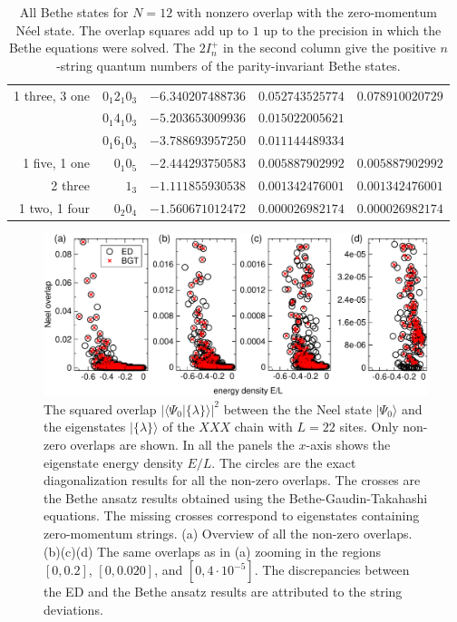 \documentclass[11pt]{iopart}
\begin{document}
\begin{table}[h]
\begin{tabular}{rrrrr}
    \midrule
1 three, 3 one &$0_1 2_1 0_3$ & $-6.340207488736$ & $0.052743525774$ & $0.078910020729$ \\
  &$0_1 4_1 0_3$ & $-5.203653009936$ & $0.015022005621$ \\
  &$0_1 6_1 0_3$ & $-3.788693957250$ & $0.011144489334$ \\
      \midrule
1 five, 1 one &$0_1 0_5$ & $-2.444293750583$ & $0.005887902992$ & $0.005887902992$ \\
      \midrule
2 three &$1_3$ & $-1.111855930538$ & $0.001342476001$ & $0.001342476001$ \\
      \midrule
1 two, 1 four &$0_2 0_4$ & $-1.560671012472$ & $0.000026982174$ & $0.000026982174$ \\
  \bottomrule
 \end{tabular}
\caption{All Bethe states for $N=12$ with nonzero overlap with the zero-momentum N\'eel state. The 
overlap squares add up to $1$ up to the precision in which the Bethe equations were solved. The 
$2I^+_n$ in the second column give the positive $n$-string quantum numbers of the parity-invariant 
Bethe states.}
\label{table:RV:sumruleN12}
\end{table}





\begin{figure}[t]
\begin{center}
\includegraphics[width=.9\textwidth]{./draft_figs/L20_BT_check}
\end{center}
\caption{ The squared overlap $|\langle\Psi_0|\{\lambda\}\rangle|^2$ between the the 
 Neel state $|\Psi_0\rangle$ and the eigenstates $|\{\lambda\}\rangle$ of the $XXX$ 
 chain with $L=22$ sites. Only non-zero overlaps are shown. In all the panels the 
 $x$-axis shows the eigenstate energy density $E/L$. The circles are the exact 
 diagonalization results for all the non-zero overlaps. The crosses are the Bethe 
 ansatz results obtained using the Bethe-Gaudin-Takahashi equations. The missing 
 crosses correspond to eigenstates containing zero-momentum strings. (a) Overview 
 of all the non-zero overlaps. (b)(c)(d) The same overlaps as in (a) zooming in 
 the regions $[0,0.2]$, $[0,0.020]$, and $[0,4\cdot 10^{-5}]$. The discrepancies 
 between the ED and the Bethe ansatz results are attributed to the string deviations. 
}
\label{fig1-BGT-check}
\end{figure}
\end{document}
